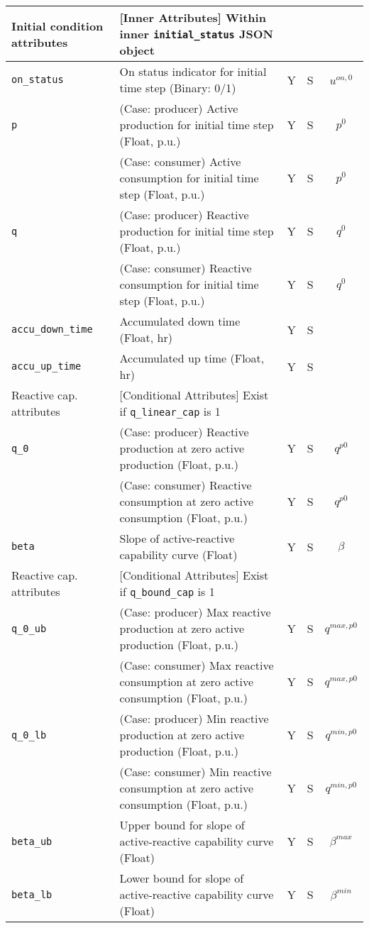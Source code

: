 \documentclass{article}
\begin{document}
\begin{center}
\small
\begin{tabular}{ l | l | c | c | c |}
  Initial condition attributes &  [Inner Attributes] Within inner {\tt initial\_status} JSON object &  &  & \\
  \hline
  {\tt on\_status} & On status indicator for initial time step (Binary: 0/1) & Y & S & $u^{on,0}$\\
  {\tt p} & { (Case: producer) Active production for initial time step (Float, p.u.) }& Y & S & $p^0$ \\
          & { (Case: consumer) Active consumption for initial time step (Float, p.u.) }& Y & S & $p^0$ \\
  {\tt q} & { (Case: producer) Reactive production for initial time step (Float, p.u.) }& Y & S & $q^0$ \\
          & { (Case: consumer) Reactive consumption for initial time step (Float, p.u.) }& Y & S & $q^0$ \\
  {\tt accu\_down\_time} & Accumulated down time (Float, hr) & Y & S & \\
  {\tt accu\_up\_time} & Accumulated up time (Float, hr) & Y & S & \\
 \hline
 \hline
  Reactive cap. attributes & [Conditional Attributes] Exist if {\tt q\_linear\_cap} is 1 &  &  & \\
  \hline
  {\tt q\_0}               & { (Case: producer) Reactive production at zero active production (Float, p.u.) }& Y & S & $q^{p0}$\\
                           & { (Case: consumer) Reactive consumption at zero active consumption (Float, p.u.) }& Y & S & $q^{p0}$\\
  {\tt beta}          & Slope of active-reactive capability curve (Float) & Y & S & $\beta$\\
  \hline
  Reactive cap. attributes & [Conditional Attributes] Exist if {\tt q\_bound\_cap} is 1 &  &  & \\
  \hline
  {\tt q\_0\_ub}           & { (Case: producer) Max reactive production at zero active production (Float, p.u.)} & Y & S & $q^{max,p0}$\\
                           & { (Case: consumer) Max reactive consumption at zero active consumption (Float, p.u.)} & Y & S & $q^{max,p0}$\\
  {\tt q\_0\_lb}           & { (Case: producer) Min reactive production at zero active production (Float, p.u.)} & Y & S & $q^{min,p0}$\\
                           & { (Case: consumer) Min reactive consumption at zero active consumption (Float, p.u.)} & Y & S & $q^{min,p0}$\\

  {\tt beta\_ub}      & Upper bound for slope of active-reactive capability curve (Float) & Y & S & $\beta^{max}$\\
  {\tt beta\_lb}      & Lower bound for slope of active-reactive capability curve (Float) & Y & S & $\beta^{min}$\\
  \hline
\end{tabular}
\end{center}
\end{document}
